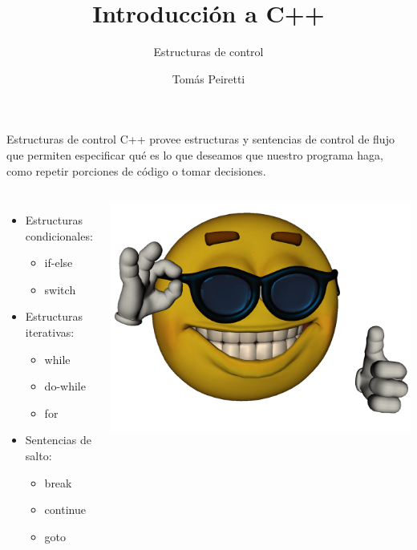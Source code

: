 \documentclass[12pt]{beamer}
\title{Introducción a C++}
\subtitle{Estructuras de control}
\author{Tomás Peiretti}
\date{}
\begin{document}
\maketitle

\begin{frame}{Estructuras de control}
    C++ provee estructuras y sentencias de control de flujo que permiten especificar qué es lo que deseamos que nuestro programa haga, como repetir porciones de código o tomar decisiones.
    \begin{columns}
        \begin{itemize}
            \item Estructuras condicionales:
            \begin{itemize}
                \item if-else
                \item switch
            \end{itemize} 
            \item Estructuras iterativas:
            \begin{itemize}
                \item while
                \item do-while
                \item for
            \end{itemize}
            \item Sentencias de salto:
            \begin{itemize}
                \item break
                \item continue
                \item goto
            \end{itemize}
        \end{itemize}
        \includegraphics[width=\textwidth]{cool.png}
    \end{columns}
\end{frame}
\end{document}
